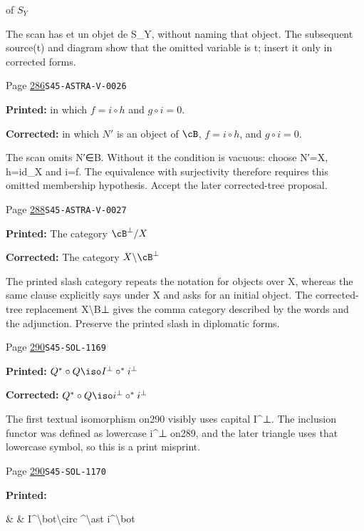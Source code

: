 \begin{description}
    of $S_Y$
\par\noindent The scan has et un objet de S\_Y, without naming that object. The subsequent source(t) and diagram show that the omitted variable is t; insert it only in corrected forms.
\smallskip
\item[\hypertarget{apparatus:EN-0201}{201}] Page \hyperlink{printpage:en:286}{286}\quad\texttt{S45-ASTRA-V-0026}
\par\noindent\textbf{Printed:} in which $f=i\circ h$ and $g\circ i=0$.
\par\noindent\textbf{Corrected:} in which $N'$ is an object of $\cB$, $f=i\circ h$, and $g\circ i=0$.
\par\noindent The scan omits N′∈B. Without it the condition is vacuous: choose N′=X, h=id\_X and i=f. The equivalence with surjectivity therefore requires this omitted membership hypothesis. Accept the later corrected-tree proposal.
\smallskip
\item[\hypertarget{apparatus:EN-0202}{202}] Page \hyperlink{printpage:en:288}{288}\quad\texttt{S45-ASTRA-V-0027}
\par\noindent\textbf{Printed:} The category $\cB^\bot/X$
\par\noindent\textbf{Corrected:} The category $X\backslash\cB^\bot$
\par\noindent The printed slash category repeats the notation for objects over X, whereas the same clause explicitly says under X and asks for an initial object. The corrected-tree replacement X\textbackslash{}B⊥ gives the comma category described by the words and the adjunction. Preserve the printed slash in diplomatic forms.
\smallskip
\item[\hypertarget{apparatus:EN-0203}{203}] Page \hyperlink{printpage:en:290}{290}\quad\texttt{S45-SOL-1169}
\par\noindent\textbf{Printed:} \(Q^\ast\circ Q\iso I^\bot\circ ^\ast i^\bot\)
\par\noindent\textbf{Corrected:} \(Q^\ast\circ Q\iso i^\bot\circ ^\ast i^\bot\)
\par\noindent The first textual isomorphism on290 visibly uses capital I\textasciicircum{}⊥. The inclusion functor was defined as lowercase i\textasciicircum{}⊥ on289, and the later triangle uses that lowercase symbol, so this is a print misprint.
\smallskip
\item[\hypertarget{apparatus:EN-0204}{204}] Page \hyperlink{printpage:en:290}{290}\quad\texttt{S45-SOL-1170}
\par\noindent\textbf{Printed:} {\footnotesize\ttfamily\raggedright \& \& I\textasciicircum{}\allowbreak{}\textbackslash{}\allowbreak{}bot\textbackslash{}\allowbreak{}circ \textasciicircum{}\allowbreak{}\textbackslash{}\allowbreak{}ast i\textasciicircum{}\allowbreak{}\textbackslash{}\allowbreak{}bot}

\end{description}
